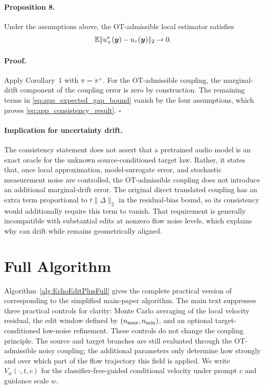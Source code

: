 \paragraph{Proposition 8.}
Under the assumptions above, the OT-admissible local estimator satisfies
\begin{equation}
    \label{eq:app_consistency_result}
    \mathbb{E}\|u_+^\star(\boldsymbol{y})-u_\tau(\boldsymbol{y})\|_2
    \rightarrow 0.
\end{equation}

\paragraph{Proof.}
Apply Corollary~1 with $\pi=\pi^+$.
For the OT-admissible coupling, the marginal-drift component of the coupling error is zero by construction.
The remaining terms in \eqref{eq:app_expected_gap_bound} vanish by the four assumptions, which proves \eqref{eq:app_consistency_result}.
\hfill$\square$

\paragraph{Implication for uncertainty drift.}
The consistency statement does not assert that a pretrained audio model is an exact oracle for the unknown source-conditioned target law.
Rather, it states that, once local approximation, model-surrogate error, and stochastic measurement noise are controlled, the OT-admissible coupling does not introduce an additional marginal-drift error.
The original direct translated coupling has an extra term proportional to $t\|\Delta\|_2$ in the residual-bias bound, so its consistency would additionally require this term to vanish.
That requirement is generally incompatible with substantial edits at nonzero flow noise levels, which explains why \method can drift while \methodplus remains geometrically aligned.

\section{Full Algorithm}
\label{app:full_algorithm}

Algorithm~\ref{alg:EchoEditPlusFull} gives the complete practical version of \methodplus corresponding to the simplified main-paper algorithm.
The main text suppresses three practical controls for clarity: Monte Carlo averaging of the local velocity residual, the edit window defined by $(n_{\max},n_{\min})$, and an optional target-conditioned low-noise refinement.
These controls do not change the coupling principle.
The source and target branches are still evaluated through the OT-admissible noisy coupling; the additional parameters only determine how strongly and over which part of the flow trajectory this field is applied.
We write $V_w(\cdot,t,c)$ for the classifier-free-guided conditional velocity under prompt $c$ and guidance scale $w$.

